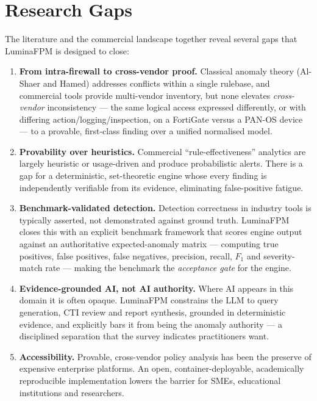 \section{Research Gaps}
\label{sec:ch2-gaps}
The literature and the commercial landscape together reveal several gaps that LuminaFPM is designed to close:

\begin{enumerate}[leftmargin=2em]
  \item \textbf{From intra-firewall to cross-vendor proof.} Classical anomaly theory (Al-Shaer and Hamed) addresses conflicts within a single rulebase, and commercial tools provide multi-vendor inventory, but none elevates \emph{cross-vendor} inconsistency --- the same logical access expressed differently, or with differing action/logging/inspection, on a FortiGate versus a PAN-OS device --- to a provable, first-class finding over a unified normalised model.
  \item \textbf{Provability over heuristics.} Commercial ``rule-effectiveness'' analytics are largely heuristic or usage-driven and produce probabilistic alerts. There is a gap for a deterministic, set-theoretic engine whose every finding is independently verifiable from its evidence, eliminating false-positive fatigue.
  \item \textbf{Benchmark-validated detection.} Detection correctness in industry tools is typically asserted, not demonstrated against ground truth. LuminaFPM closes this with an explicit benchmark framework that scores engine output against an authoritative expected-anomaly matrix --- computing true positives, false positives, false negatives, precision, recall, $F_1$ and severity-match rate --- making the benchmark the \emph{acceptance gate} for the engine.
  \item \textbf{Evidence-grounded AI, not AI authority.} Where AI appears in this domain it is often opaque. LuminaFPM constrains the LLM to query generation, CTI review and report synthesis, grounded in deterministic evidence, and explicitly bars it from being the anomaly authority --- a disciplined separation that the survey indicates practitioners want.
  \item \textbf{Accessibility.} Provable, cross-vendor policy analysis has been the preserve of expensive enterprise platforms. An open, container-deployable, academically reproducible implementation lowers the barrier for SMEs, educational institutions and researchers.
\end{enumerate}

